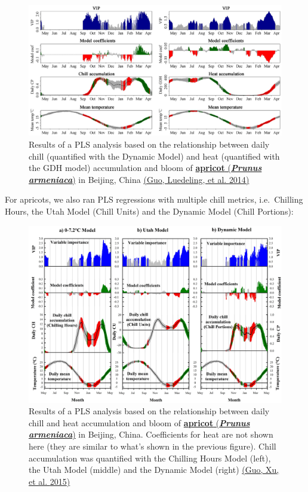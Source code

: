 \documentclass[
]{book}
\begin{document}
\begin{figure}
\centering
\includegraphics{pictures/PLS_chill_force_apricot_Beijing.png}
\caption{Results of a PLS analysis based on the relationship between daily chill (quantified with the Dynamic Model) and heat (quantified with the GDH model) accumulation and bloom of \href{https://en.wikipedia.org/wiki/Prunus_armeniaca}{\textbf{apricot} (\textbf{\emph{Prunus armeniaca}})} in Beijing, China \href{https://journal.kib.ac.cn/EN/volumn/volumn_1319.shtml\#1}{(Guo, Luedeling, et al. \protect\hyperlink{ref-guo2014differences}{2014})}}
\end{figure}

For apricots, we also ran PLS regressions with multiple chill metrics, i.e.~Chilling Hours, the Utah Model (Chill Units) and the Dynamic Model (Chill Portions):

\begin{figure}
\centering
\includegraphics{pictures/PLS_chill_force_apricot_3chillmodels.png}
\caption{Results of a PLS analysis based on the relationship between daily chill and heat accumulation and bloom of \href{https://en.wikipedia.org/wiki/Prunus_armeniaca}{\textbf{apricot} (\textbf{\emph{Prunus armeniaca}})} in Beijing, China. Coefficients for heat are not shown here (they are similar to what's shown in the previous figure). Chill accumulation was quantified with the Chilling Hours Model (left), the Utah Model (middle) and the Dynamic Model (right) \href{https://www.sciencedirect.com/science/article/abs/pii/S0304423815301710}{(Guo, Xu, et al. \protect\hyperlink{ref-guo2015statistical}{2015})}}
\end{figure}
\end{document}
